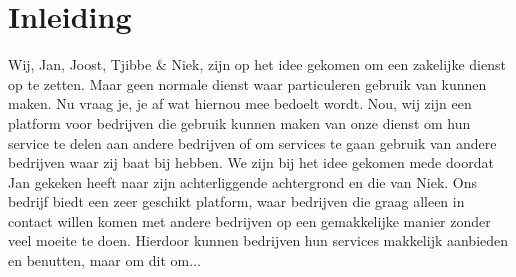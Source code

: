 \chapter{Inleiding}
Wij, Jan, Joost, Tjibbe & Niek, 
zijn op het idee gekomen om een zakelijke dienst op te zetten. 
Maar geen normale dienst waar particuleren gebruik van kunnen maken.
Nu vraag je, je af wat hiernou mee bedoelt wordt. 
Nou, wij zijn een platform voor bedrijven die gebruik kunnen maken van onze dienst om hun service te delen aan andere bedrijven of om services te gaan gebruik van andere bedrijven waar zij baat bij hebben.
We zijn bij het idee gekomen mede doordat Jan gekeken heeft naar zijn achterliggende achtergrond en die van Niek.
Ons bedrijf biedt een zeer geschikt platform,
waar bedrijven die graag alleen in contact willen komen met andere bedrijven op
een gemakkelijke manier zonder veel moeite te doen. 
Hierdoor kunnen bedrijven hun services makkelijk aanbieden en benutten,
maar om dit om...


\iffalse
Met Servicemarkt willen wij een origineel en aansprekend punt worden voor bedrijven
\fi
